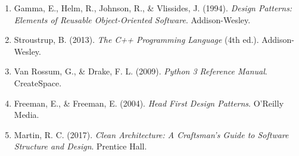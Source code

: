 \documentclass[11pt,a4paper]{article}
\begin{document}
\begin{enumerate}
    \item Gamma, E., Helm, R., Johnson, R., \& Vlissides, J. (1994). \textit{Design Patterns: Elements of Reusable Object-Oriented Software}. Addison-Wesley.
    
    \item Stroustrup, B. (2013). \textit{The C++ Programming Language} (4th ed.). Addison-Wesley.
    
    \item Van Rossum, G., \& Drake, F. L. (2009). \textit{Python 3 Reference Manual}. CreateSpace.
    
    \item Freeman, E., \& Freeman, E. (2004). \textit{Head First Design Patterns}. O'Reilly Media.
    
    \item Martin, R. C. (2017). \textit{Clean Architecture: A Craftsman's Guide to Software Structure and Design}. Prentice Hall.
\end{enumerate}
\end{document}
